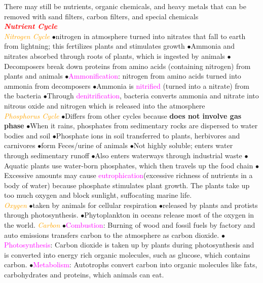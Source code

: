 \documentclass{article}
\newcommand{\ddd}{$\bullet$}
\newcommand{\red}[1]{\textcolor{red}{#1}}
\newcommand{\pink}[1]{\textcolor{magenta}{#1}}
\newcommand{\orange}[1]{\textcolor{orange}{#1}}
\newcommand{\mysection}[1]{\textbf{\textit{\red{#1}}}}
\newcommand{\mysubsection}[1]{{\textit{\orange{#1}}}}
\newcommand{\vocab}[1]{{\pink{#1}}}
\begin{document}
\begin{multicols*}{4}
    	    There may still be nutrients, organic chemicals, and heavy metals that can be removed with sand filters, carbon filters, and special chemicals
    \\
    \mysection{Nutrient Cycle}
    \\
        \mysubsection{Nitrogen Cycle}
            \ddd nitrogen in atmosphere turned into nitrates that fall to earth from lightning; this fertilizes plants and stimulates growth
            \ddd Ammonia and nitrates absorbed through roots of plants, which is ingested by animals
            \ddd Decomposers break down proteins from amino acids (containing nitrogen) from plants and animals 
            \ddd \vocab{Ammonification}: nitrogen from amino acids turned into ammonia from decomposers
            \ddd Ammonia is \vocab{nitrified} (turned into a nitrate) from the bacteria
            \ddd Through \vocab{denitrification}, bacteria converts ammonia and nitrate into nitrous oxide and nitrogen which is released into the atmosphere
    \\
        \mysubsection{Phosphorus Cycle}
            \ddd Differs from other cycles because \textbf{does not involve gas phase}
            \ddd When it rains, phosphates from sedimentary rocks are dispersed to water bodies and soil
            \ddd Phosphate ions in soil transferred to plants, herbivores and carnivores
            \ddd form Feces/urine of animals
            \ddd Not highly soluble; enters water through sedimentary runoff
            \ddd Also enters waterways through industrial waste
            \ddd Aquatic plants use water-born phosphates, which then travels up the food chain
            \ddd Excessive amounts may cause \vocab{eutrophication}(excessive richness of nutrients in a body of water) because phosphate stimulates plant growth. The plants take up too much oxygen and block sunlight, suffocating marine life. 
        \\
        \mysubsection{Oxygen}
            \ddd taken by animals for cellular respiration
            \ddd released by plants and protists through photosynthesis.
            \ddd Phytoplankton in oceans release most of the oxygen in the world.
        \mysubsection{Carbon}
            \ddd \vocab{Combustion}: Burning of wood and fossil fuels by factory and auto emissions transfers carbon to the atmosphere as carbon dioxide.
            \ddd \vocab{Photosynthesis}: Carbon dioxide is taken up by plants during photosynthesis and is converted into energy rich organic molecules, such as glucose, which contains carbon.
            \ddd \vocab{Metabolism}: Autotrophs convert carbon into organic molecules like fats, carbohydrates and proteins, which animals can eat.

\end{multicols*}
\end{document}
